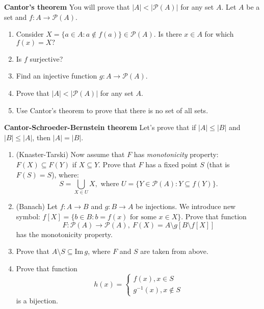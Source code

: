 \begin{prob}
	\textbf{Cantor's theorem} You will prove that $|A|<\left|\mathcal P(A)\right|$ for any set $A$. Let $A$ be a set and $f:A\to \mathcal P(A).$
	\begin{enumerate}
		\item Consider $X=\{a\in A : a\notin f(a)\}\in \mathcal P(A)$. Is there $x\in A$ for which $f(x)=X?$
		\item Is $f$ surjective?
		\item Find an injective function $g: A\to \mathcal P(A)$.
		\item Prove that $|A| < |\mathcal P(A)|$ for any set $A$.
		\item Use Cantor's theorem to prove that there is no set of all sets.
	\end{enumerate}
\end{prob}

\begin{prob}
	\textbf{Cantor-Schroeder-Bernstein theorem} Let's prove that if $|A|\le|B|$ and $|B|\le |A|$, then $|A|=|B|$.
	\begin{enumerate}
		\item (Knaster-Tarski) Now assume that $F$ has \textit{monotonicity} property: $F(X)\subseteq F(Y)$ if $X\subseteq Y$.
			Prove that $F$ has a fixed point $S$ (that is $F(S)=S$), where:
			$$S=\bigcup_{X\in U} X, \text{~where~} U= \{Y\in \mathcal P(A) : Y\subseteq f(Y)\}.$$
		\item (Banach) Let $f: A\to B$ and $g:B\to A$ be injections.
			We introduce new symbol: $f[X]=\{b\in B : b=f(x) \text{ for some } x\in X\}$. Prove that
			function $$F:\mathcal P(A)\to \mathcal P(A),~F(X)=A\setminus g[B\setminus f[X]]$$
			has the monotonicity property.
    \item Prove that $A\setminus S\subseteq \text{Im}\,g$, where
      $F$ and $S$ are taken from above.
		\item Prove that function
			$$h(x) =
				\begin{cases}
					f(x), x\in S\\
					g^{-1}(x), x \notin S
				\end{cases}
			 $$
			 is a bijection.
	\end{enumerate}
\end{prob}
